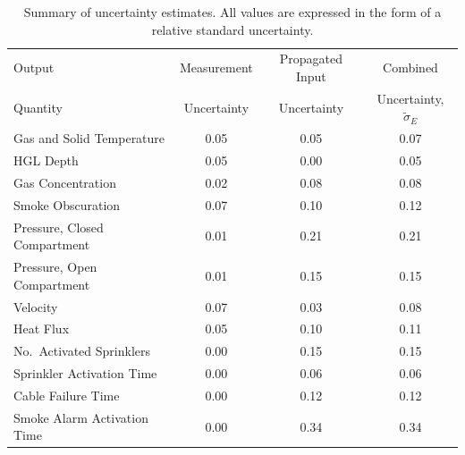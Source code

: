 \begin{table}[ht]
\caption[Summary of uncertainty estimates]{Summary of uncertainty estimates. All values are expressed in the form of a relative standard uncertainty.}
\begin{center}
\begin{tabular}{|l|c|c|c|}
\hline
Output                        & Measurement     & Propagated Input  & Combined                                  \\
Quantity                      & Uncertainty     & Uncertainty       & Uncertainty, $\widetilde{\sigma}_E$       \\ \hline \hline
Gas and Solid Temperature     & 0.05            & 0.05              & 0.07                                      \\ \hline
HGL Depth                     & 0.05            & 0.00              & 0.05                                      \\ \hline
Gas Concentration             & 0.02            & 0.08              & 0.08                                      \\ \hline
Smoke Obscuration             & 0.07            & 0.10              & 0.12                                      \\ \hline
Pressure, Closed Compartment  & 0.01            & 0.21              & 0.21                                      \\ \hline
Pressure, Open Compartment    & 0.01            & 0.15              & 0.15                                      \\ \hline
Velocity                      & 0.07            & 0.03              & 0.08                                      \\ \hline
Heat Flux                     & 0.05            & 0.10              & 0.11                                      \\ \hline
No.~Activated Sprinklers      & 0.00            & 0.15              & 0.15                                      \\ \hline
Sprinkler Activation Time     & 0.00            & 0.06              & 0.06                                      \\ \hline
Cable Failure Time            & 0.00            & 0.12              & 0.12                                      \\ \hline
Smoke Alarm Activation Time   & 0.00            & 0.34              & 0.34                                      \\ \hline
\end{tabular}
\end{center}
\label{Uncertainty}
\end{table}



